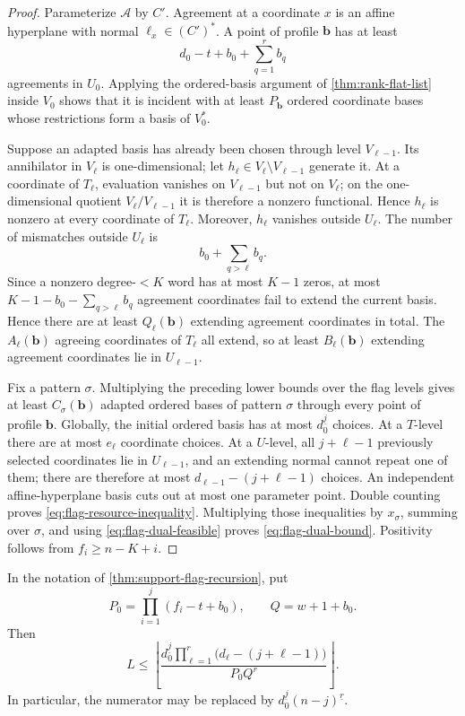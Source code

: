 \documentclass[11pt,a4paper]{amsart}
\numberwithin{equation}{section}
\theoremstyle{remark}
\begin{document}
\begin{proof}
Parameterize $\mathcal A$ by $C'$.  Agreement at a coordinate $x$ is an
affine hyperplane with normal $\ell_x\in(C')^*$.  A point of profile
$\mathbf b$ has at least
\[
 d_0-t+b_0+\sum_{q=1}^{r}b_q
\]
agreements in $U_0$.  Applying the ordered-basis argument of
\cref{thm:rank-flat-list} inside $V_0$ shows that it is incident with at
least $P_{\mathbf b}$ ordered coordinate bases whose restrictions form a
basis of $V_0^*$.

Suppose an adapted basis has already been chosen through level
$V_{\ell-1}$.  Its annihilator in $V_\ell$ is one-dimensional; let
$h_\ell\in V_\ell\setminus V_{\ell-1}$ generate it.  At a coordinate
of $T_\ell$, evaluation vanishes on $V_{\ell-1}$ but not on $V_\ell$;
on the one-dimensional quotient $V_\ell/V_{\ell-1}$ it is therefore a
nonzero functional.  Hence $h_\ell$ is nonzero at every coordinate of
$T_\ell$.
Moreover, $h_\ell$ vanishes outside $U_\ell$.  The number of mismatches
outside $U_\ell$ is
\[
 b_0+\sum_{q>\ell}b_q.
\]
Since a nonzero degree-$<K$ word has at most $K-1$ zeros, at most
$K-1-b_0-\sum_{q>\ell}b_q$ agreement coordinates fail to extend the
current basis.  Hence there are at least
$Q_\ell(\mathbf b)$ extending agreement coordinates in total.  The
$A_\ell(\mathbf b)$ agreeing coordinates of $T_\ell$ all extend, so at
least $B_\ell(\mathbf b)$ extending agreement coordinates lie in
$U_{\ell-1}$.

Fix a pattern $\sigma$.  Multiplying the preceding lower bounds over the
flag levels gives at least $C_\sigma(\mathbf b)$ adapted ordered bases
of pattern $\sigma$ through every point of profile $\mathbf b$.  Globally,
the initial ordered basis has at most $d_0^{\underline j}$ choices.  At a
$T$-level there are at most $e_\ell$ coordinate choices.  At a $U$-level,
all $j+\ell-1$ previously selected coordinates lie in $U_{\ell-1}$, and
an extending normal cannot repeat one of them; there are therefore at
most $d_{\ell-1}-(j+\ell-1)$ choices.  An independent affine-hyperplane
basis cuts out at most one parameter point.  Double counting proves
\eqref{eq:flag-resource-inequality}.  Multiplying those inequalities by
$x_\sigma$, summing over $\sigma$, and using
\eqref{eq:flag-dual-feasible} proves \eqref{eq:flag-dual-bound}.
Positivity follows from $f_i\ge n-K+i$.
\end{proof}

\begin{corollary}
\label{cor:flag-all-extender}
In the notation of \cref{thm:support-flag-recursion}, put
\[
 P_0=\prod_{i=1}^{j}(f_i-t+b_0),
 \qquad Q=w+1+b_0.
\]
Then
\begin{equation}
 \boxed{
 L\le
 \left\lfloor
 \frac{d_0^{\underline j}
       \prod_{\ell=1}^{r}
       \bigl(d_\ell-(j+\ell-1)\bigr)}
      {P_0Q^r}
 \right\rfloor.}
 \label{eq:flag-all-extender}
\end{equation}
In particular, the numerator may be replaced by
$d_0^{\underline j}(n-j)^{\underline r}$.
\end{corollary}
\end{document}
